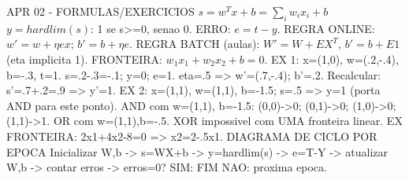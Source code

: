 APR 02 - FORMULAS/EXERCICIOS
$s=w^Tx+b=\sum_iw_ix_i+b$
$y=hardlim(s)$: 1 se s>=0, senao 0.
ERRO: $e=t-y$.
REGRA ONLINE: $w'=w+\eta ex$; $b'=b+\eta e$.
REGRA BATCH (aulas): $W'=W+EX^T$, $b'=b+E1$ (eta implicita 1).
FRONTEIRA: $w_1x_1+w_2x_2+b=0$.
EX 1: x=(1,0), w=(.2,-.4), b=-.3, t=1.
s=.2-.3=-.1; y=0; e=1.
eta=.5 => w'=(.7,-.4); b'=.2.
Recalcular: s'=.7+.2=.9 => y'=1.
EX 2: x=(1,1), w=(1,1), b=-1.5;
s=.5 => y=1 (porta AND para este ponto).
AND com w=(1,1), b=-1.5:
(0,0)->0; (0,1)->0; (1,0)->0; (1,1)->1.
OR com w=(1,1),b=-.5.
XOR impossivel com UMA fronteira linear.
EX FRONTEIRA:
2x1+4x2-8=0 => x2=2-.5x1.
DIAGRAMA DE CICLO POR EPOCA
Inicializar W,b
  -> s=WX+b -> y=hardlim(s)
  -> e=T-Y -> atualizar W,b
  -> contar erros
  -> erros=0? SIM: FIM
               NAO: proxima epoca.